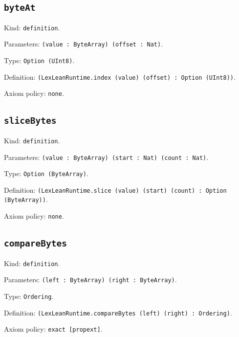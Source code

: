 \documentclass[11pt]{article}
\begin{document}
\subsection*{\texttt{byteAt}}
\noindent Kind: \texttt{definition}.\par
\noindent Parameters: \texttt{(value : ByteArray) (offset : Nat)}.\par
\noindent Type: \texttt{Option (UInt8)}.\par
\noindent Definition: \texttt{(LexLeanRuntime.index (value) (offset) : Option (UInt8))}.\par
\noindent Axiom policy: \texttt{none}.\par
\subsection*{\texttt{sliceBytes}}
\noindent Kind: \texttt{definition}.\par
\noindent Parameters: \texttt{(value : ByteArray) (start : Nat) (count : Nat)}.\par
\noindent Type: \texttt{Option (ByteArray)}.\par
\noindent Definition: \texttt{(LexLeanRuntime.slice (value) (start) (count) : Option (ByteArray))}.\par
\noindent Axiom policy: \texttt{none}.\par
\subsection*{\texttt{compareBytes}}
\noindent Kind: \texttt{definition}.\par
\noindent Parameters: \texttt{(left : ByteArray) (right : ByteArray)}.\par
\noindent Type: \texttt{Ordering}.\par
\noindent Definition: \texttt{(LexLeanRuntime.compareBytes (left) (right) : Ordering)}.\par
\noindent Axiom policy: \texttt{exact [propext]}.\par
\end{document}
